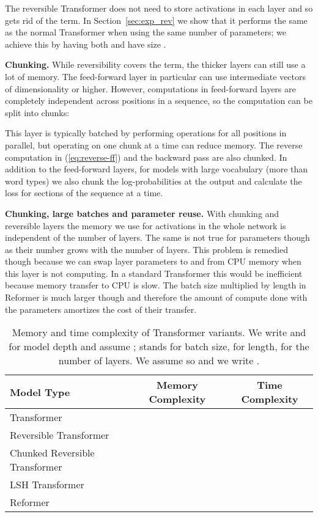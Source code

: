 \documentclass{article} \usepackage{iclr2020_conference,times}
\renewcommand{\paragraph}[1]{\textbf{#1}}
\begin{document}
The reversible Transformer does not need to store activations in each layer
and so gets rid of the  term.  In Section~\ref{sec:exp_rev} we show that it performs the same as the normal Transformer when using  the same number of parameters; we achieve this by having both  and  have size .

\paragraph{Chunking.}
While reversibility covers the  term, the thicker layers can still use
a lot of memory. The feed-forward layer in particular can use intermediate vectors 
of dimensionality  or higher. However, computations in feed-forward layers 
are completely independent across positions in a sequence, so the computation can be split 
into  chunks:


This layer is typically batched by performing operations for all positions in parallel, but operating on one chunk at a time can reduce memory. The reverse computation in (\ref{eq:reverse-ff}) and the backward pass are also chunked.
In addition to the feed-forward layers, for models with large vocabulary (more than  word types) we also chunk the log-probabilities at the output and calculate the loss for sections of the sequence at a time.

\paragraph{Chunking, large batches and parameter reuse.}
With chunking and reversible layers the memory we use for activations
in the whole network is independent of the number of layers. The same is
not true for parameters though as their number grows with the number of layers. This problem is remedied though because we can swap layer
parameters to and from CPU memory when this layer is not computing.
In a standard Transformer this would be inefficient because memory
transfer to CPU is slow. The batch size multiplied by length in Reformer
is much larger though and therefore the amount of compute done with the parameters amortizes the cost of their transfer.

\begin{table}
\caption{Memory and time complexity of Transformer variants.
  We write  and  for model depth and assume ;  stands for batch size,  for length,  for the number of layers.
  We assume  so  and we write .}
\label{tab:tcomplexity}
\begin{center}
\begin{tabular}{lcc}
Model Type & Memory Complexity & Time Complexity  \\
\hline
Transformer &  &  \\
Reversible Transformer &  &  \\
Chunked Reversible Transformer &  &  \\
LSH Transformer &  &  \\
Reformer &  &  \\

\end{tabular}
\end{center}
\end{table}
\end{document}
